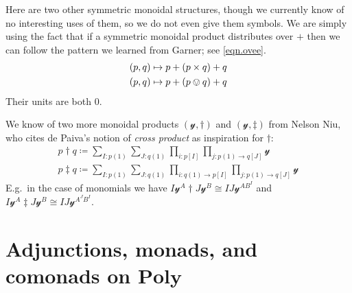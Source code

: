 \documentclass[11pt, one side, article]{memoir}
\theoremstyle{definition}
\theoremstyle{plain}
\newcommand{\Cat}[1]{\mathbf{#1}}%
\newcommand{\yon}{\mathcal{y}}
\newcommand{\poly}{\Cat{Poly}}
\newcommand{\0}{\textsf{0}}
\newcommand{\1}{\tn{\textsf{1}}}
\begin{document}
Here are two other symmetric monoidal structures, though we currently know of no interesting uses of them, so we do not even give them symbols. We are simply using the fact that if a symmetric monoidal product distributes over $+$ then we can follow the pattern we learned from Garner; see \eqref{eqn.ovee}.
\begin{align}
	(p,q)&\mapsto p+(p\times q)+q\\
	(p,q)&\mapsto p+(p\ovee q)+q
\end{align}
Their units are both $0$. 

We know of two more monoidal products $(\yon,\dagger)$ and $(\yon, \ddagger)$ from Nelson Niu, who cites de Paiva's notion of \emph{cross product} as inspiration for $\dagger$:
\begin{align}
	p\dagger q\coloneqq\sum_{I: p(1)}\sum_{J: q(1)}\prod_{i: p[I]}\prod_{j\colon p(1)\to q[J]}\yon\\
	p\ddagger q\coloneqq\sum_{I: p(1)}\sum_{J: q(1)}\prod_{i\colon q(1)\to p[I]}\prod_{j\colon p(1)\to q[J]}\yon
\end{align}
E.g.\ in the case of monomials we have $I\yon^A\dagger J\yon^B\cong IJ\yon^{AB^I}$ and $I\yon^A\ddagger J\yon^B\cong IJ\yon^{A^JB^I}$.



\chapter{Adjunctions, monads, and comonads on $\poly$}\label{chap.adj_mon_com}
\end{document}
